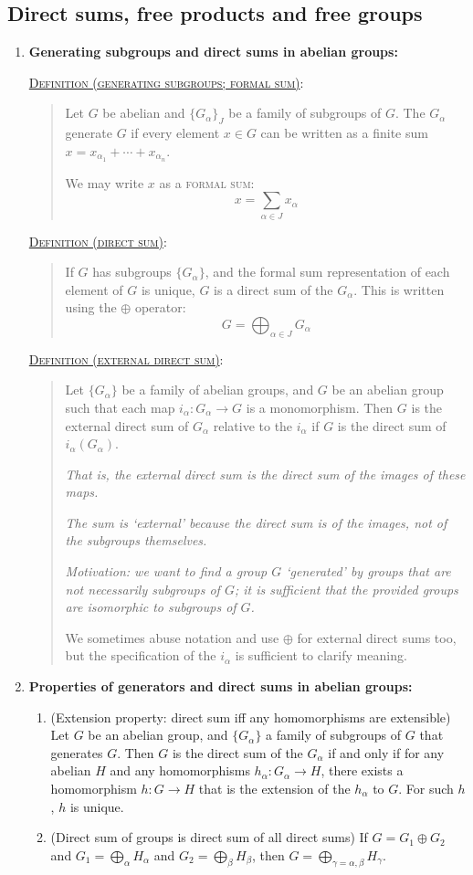\documentclass[letterpaper, 12pt]{article}
\newcommand{\defn}[2]{\textsc{\underline{Definition (#1)}:}\begin{quote} #2\end{quote}}
\begin{document}
    \subsection{Direct sums, free products and free groups}
        \begin{enumerate}[resume]
        \item \textbf{Generating subgroups and direct sums in abelian groups:} %

            \defn{generating subgroups; formal sum}{Let $G$ be abelian and $\{G_\alpha\}_J$ be a family of subgroups of $G$. The $G_\alpha$ generate $G$ if every element $x\in G$ can be written as a finite sum $x = x_{\alpha_1} + \cdots + x_{\alpha_n}$.

            We may write $x$ as a \textsc{formal sum}: \[x = \sum_{\alpha\in J} x_\alpha\]}

            \defn{direct sum}{If $G$ has subgroups $\{G_\alpha\}$, and the formal sum representation of each element of $G$ is unique, $G$ is a direct sum of the $G_\alpha$. This is written using the $\oplus$ operator: \[
                G = \bigoplus_{\alpha\in J} G_\alpha
            \]}

            \defn{external direct sum}{Let $\{G_\alpha\}$ be a family of abelian groups, and $G$ be an abelian group such that each map $i_\alpha : G_\alpha \to G$ is a monomorphism. Then $G$ is the external direct sum of $G_\alpha$ relative to the $i_\alpha$ if $G$ is the direct sum of $i_\alpha(G_\alpha)$.

            \textit{That is, the external direct sum is the direct sum of the images of these maps.}

            \textit{The sum is `external' because the direct sum is of the images, not of the subgroups themselves.}

            \textit{Motivation: we want to find a group $G$ `generated' by groups that are not necessarily subgroups of $G$; it is sufficient that the provided groups are isomorphic to subgroups of $G$.}

            We sometimes abuse notation and use $\oplus$ for external direct sums too, but the specification of the $i_\alpha$ is sufficient to clarify meaning.}
            \item \textbf{Properties of generators and direct sums in abelian groups:}
                \begin{enumerate}
                \item (Extension property: direct sum iff any homomorphisms are extensible) Let $G$ be an abelian group, and $\{G_\alpha\}$ a family of subgroups of $G$ that generates $G$. Then $G$ is the direct sum of the $G_\alpha$ if and only if for any abelian $H$ and any homomorphisms $h_\alpha : G_\alpha \to H$, there exists a homomorphism $h: G\to H$ that is the extension of the $h_\alpha$ to $G$. For such $h$, $h$ is unique.
                \item (Direct sum of groups is direct sum of all direct sums) If $G = G_1 \oplus G_2$ and $G_1 = \bigoplus_\alpha H_\alpha$ and $G_2 = \bigoplus_\beta H_\beta$, then $G = \bigoplus_{\gamma = \alpha, \beta} H_\gamma$.


\end{enumerate}
\end{enumerate}
\end{document}
